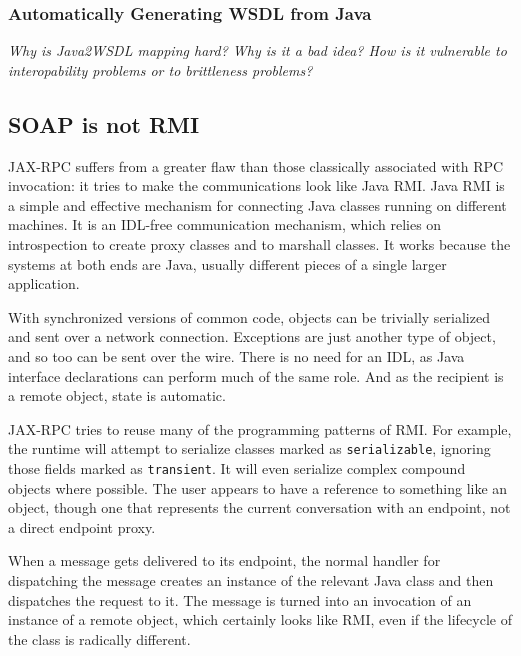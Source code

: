
\subsubsection{Automatically Generating WSDL from Java}
\label{objections:o-x:wsdl-gen}

\emph{Why is Java2WSDL mapping hard? Why is it a bad idea? How is it
vulnerable to interopability problems or to brittleness problems?}

\subsection{SOAP is not RMI}
\label{soap-not-rmi}

JAX-RPC suffers from a greater flaw than those classically associated
with RPC invocation: it tries to make the communications look like
Java RMI. Java RMI is a simple and effective mechanism for connecting
Java classes running on different machines. It is an IDL-free
communication mechanism, which relies on introspection to create proxy
classes and to marshall classes. It works because the systems at both
ends are Java, usually different pieces of a single larger
application.

With synchronized versions of common code, objects can be trivially
serialized and sent over a network connection. Exceptions are just
another type of object, and so too can be sent over the wire. There is
no need for an IDL, as Java interface declarations can perform much of
the same role. And as the recipient is a remote object, state is
automatic.

JAX-RPC tries to reuse many of the programming patterns of RMI. For
example, the runtime will attempt to serialize classes marked as
\verb|serializable|, ignoring those fields marked as
\verb|transient|. It will even serialize complex compound objects where
possible. The user appears to have a reference to something like an
object, though one that represents the current conversation with an
endpoint, not a direct endpoint proxy.

When a message gets delivered to its endpoint, the normal handler for
dispatching the message creates an instance of the relevant Java class
and then dispatches the request to it. The message is turned into an
invocation of an instance of a remote object, which certainly looks
like RMI, even if the lifecycle of the class is radically different.

